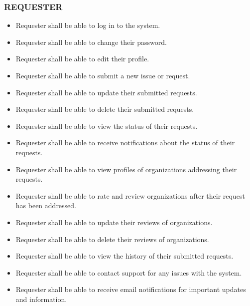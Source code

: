 \subsubsection*{REQUESTER}
\begin{itemize}
\itemsep0em 
    \item Requester shall be able to log in to the system.
    \item Requester shall be able to change their password.
    \item Requester shall be able to edit their profile.
    \item Requester shall be able to submit a new issue or request.
    \item Requester shall be able to update their submitted requests.
    \item Requester shall be able to delete their submitted requests.
    \item Requester shall be able to view the status of their requests.
    \item Requester shall be able to receive notifications about the status of their requests.
    \item Requester shall be able to view profiles of organizations addressing their requests.
    \item Requester shall be able to rate and review organizations after their request has been addressed.
    \item Requester shall be able to update their reviews of organizations.
    \item Requester shall be able to delete their reviews of organizations.
    \item Requester shall be able to view the history of their submitted requests.
    \item Requester shall be able to contact support for any issues with the system.
    \item Requester shall be able to receive email notifications for important updates and information.
\end{itemize}

